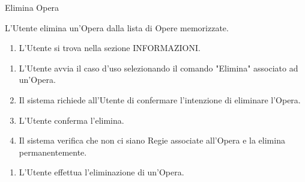 {\ucExtTable	%
{	%
	Elimina Opera
	
}{	%
	
}{	%
	L'Utente elimina un'Opera dalla lista di Opere memorizzate.
	
}{	%
	\attori
	
}{	%
	\begin{enumerate}
        \item L'Utente si trova nella sezione INFORMAZIONI.
    \end{enumerate}
	
}{	%
	\begin{enumerate}
        \item L'Utente avvia il caso d'uso selezionando il comando "Elimina" associato ad un'Opera.
        \item Il sistema richiede all'Utente di confermare l'intenzione di eliminare l'Opera.
        \item L'Utente conferma l'elimina.
        \item Il sistema verifica che non ci siano Regie associate all'Opera e la elimina permanentemente.
    \end{enumerate}
	
}{	%
	\begin{enumerate}
        \item L'Utente effettua l'eliminazione di un'Opera.
    \end{enumerate}
	
} }

